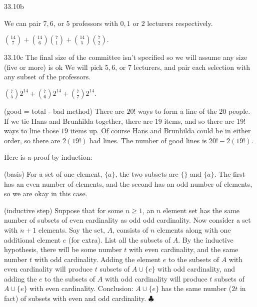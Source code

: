 \begin{Solution}{33.10b}

We can pair $7,6$, or $5$ professors with $0,1$ or $2$ lecturers respectively.

$\binom{14}{7} +\binom{14}{6}\binom{7}{1} + \binom{14}{5}\binom{7}{2}.$

\end{Solution}

\begin{Solution}{33.10c}
The final size of the committee isn't specified so we will assume any size (five or more) is ok
We will pick $5, 6$, or $7$ lecturers, and pair each selection with any subset of the professors.

$\binom{7}{5} 2^{14} + \binom{7}{6}2^{14} + \binom{7}{7}2^{14}.$

\end{Solution}

\begin{Solution}{33.11}

(good = total - bad method) There are $20!$ ways to form a line of the $20$ people. If we tie Hans and Brunhilda together, there are $19$ items,
and so there are $19!$ ways to line those $19$ items up. Of course Hans and Brunhilda could be in either order, so there are $2(19!)$ bad lines.
The number of good lines is $20! - 2(19!)$.
\end{Solution}

\begin{Solution}{33.12}

Here is a proof by induction:

(basis) For a set of one element, $\{a\}$, the two subsets are $\{ \}$ and $\{a\}$. The first has an even number of elements, and the second has an odd number of elements, so we are okay in this case.

(inductive step) Suppose that for some $n\geq 1$, an $n$ element set has the same number of subsets of even cardinality as odd odd cardinality. Now consider a set with $n+1$ elements. Say the set, $A$, consists of $n$ elements
along with one additional element $e$ (for extra). List all the subsets of $A$. By the inductive hypothesis, there will be some number $t$ with even cardinality, and the same number $t$ with odd cardinality. Adding the element $e$
to the subsets of $A$ with even cardinality will produce $t$ subsets of $A \cup \{e\}$ with odd cardinality, and adding the $e$ to the subsets of $A$ with odd cardinality will produce $t$ subsets of $A \cup \{e\}$ with even cardinality. Conclusion: $A \cup \{e\}$ has the same number ($2t$ in fact) of subsets with even and odd cardinality.
$\clubsuit$

\end{Solution}

